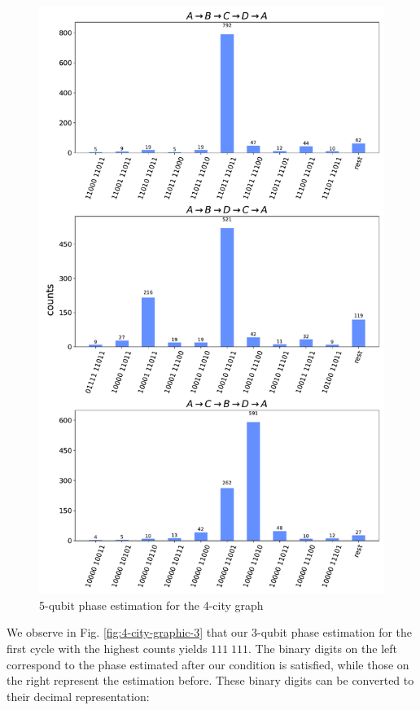 \documentclass[msc,oneside]{ubcthesis}
\begin{document}
		\begin{figure}[!h]
		\centering
		\includegraphics[width=\textwidth,height=0.9\textheight,keepaspectratio]{"graphics/5qubit-4city"}
		\caption{5-qubit phase estimation for the 4-city graph}
		\label{fig:4-city-graphic-5}
	\end{figure}		
	
 We observe in Fig. \ref{fig:4-city-graphic-3} that our 3-qubit phase estimation for the first cycle with the highest counts yields $111\; 111$. The binary digits on the left correspond to the phase estimated after our condition is satisfied, while those on the right represent the estimation before. These binary digits can be converted to their decimal representation: 
 
\end{document}
